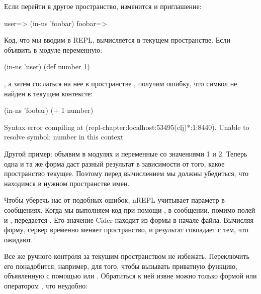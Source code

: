 Если перейти в другое пространство, изменится и приглашение:

\begin{english}
  \begin{clojure}
user=> (in-ns 'foobar)
foobar=>
  \end{clojure}
\end{english}

Код, что мы вводим в REPL, вычисляется в текущем пространстве. Если объявить в модуле  переменную:

\begin{english}
  \begin{clojure}
(in-ns 'user)
(def number 1)
  \end{clojure}
\end{english}

, а затем сослаться на нее в пространстве , получим ошибку, что символ  не найден в текущем контексте:

\begin{english}
  \begin{clojure}
(in-ns 'foobar)
(+ 1 number)

Syntax error compiling at (repl-chapter:localhost:53495(clj)*:1:8440).
Unable to resolve symbol: number in this context
  \end{clojure}
\end{english}

Другой пример: объявим в модулях  и  переменные  со значениями 1 и 2. Теперь одна и та же форма  даст разный результат в зависимости от того, какое пространство текущее. Поэтому перед вычислением мы должны убедиться, что находимся в нужном пространстве имен.

Чтобы уберечь нас от подобных ошибок, nREPL учитывает параметр  в сообщениях. Когда мы выполняем код при помощи , в сообщении, помимо полей  и , передается . Его значение Cider находит из формы  в начале файла. Вычисляя форму, сервер временно меняет пространство, и результат совпадает с тем, что ожидают.

Все же ручного контроля за текущим пространством не избежать. Переключить его понадобится, например, для того, чтобы вызывать приватную функцию, объявленную с помощью  или . Обратиться к ней извне можно только формой  или оператором , что неудобно:

